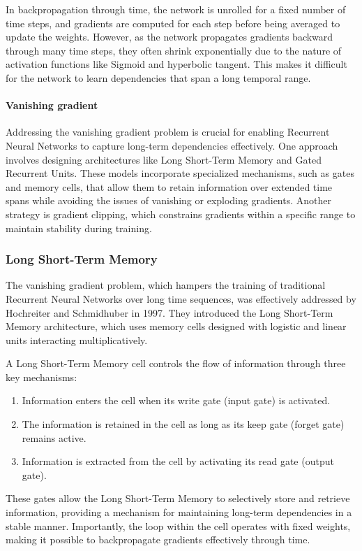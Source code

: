In backpropagation through time, the network is unrolled for a fixed number of time steps, and gradients are computed for each step before being averaged to update the weights.
However, as the network propagates gradients backward through many time steps, they often shrink exponentially due to the nature of activation functions like Sigmoid and hyperbolic tangent. 
This makes it difficult for the network to learn dependencies that span a long temporal range.

\paragraph*{Vanishing gradient}
Addressing the vanishing gradient problem is crucial for enabling Recurrent Neural Networks to capture long-term dependencies effectively. 
One approach involves designing architectures like Long Short-Term Memory and Gated Recurrent Units. 
These models incorporate specialized mechanisms, such as gates and memory cells, that allow them to retain information over extended time spans while avoiding the issues of vanishing or exploding gradients. 
Another strategy is gradient clipping, which constrains gradients within a specific range to maintain stability during training.

\subsubsection{Long Short-Term Memory}
The vanishing gradient problem, which hampers the training of traditional Recurrent Neural Networks over long time sequences, was effectively addressed by Hochreiter and Schmidhuber in 1997. 
They introduced the Long Short-Term Memory architecture, which uses memory cells designed with logistic and linear units interacting multiplicatively.

A Long Short-Term Memory cell controls the flow of information through three key mechanisms:
\begin{enumerate}
    \item Information enters the cell when its write gate (input gate) is activated.
    \item The information is retained in the cell as long as its keep gate (forget gate) remains active.
    \item Information is extracted from the cell by activating its read gate (output gate).
\end{enumerate}
These gates allow the Long Short-Term Memory to selectively store and retrieve information, providing a mechanism for maintaining long-term dependencies in a stable manner.
Importantly, the loop within the cell operates with fixed weights, making it possible to backpropagate gradients effectively through time.

